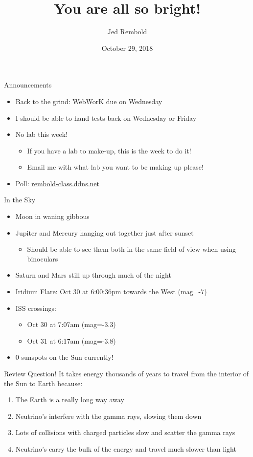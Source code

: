 \documentclass[pdf, aspectratio=169]{beamer}
\title{You are all so bright!}
\date{October 29, 2018}
\author{Jed Rembold}
\begin{document}
\renewcommand*{\theenumi}{\Alph{enumi}}

\begin{frame}{Announcements}
  \begin{itemize}
	  \item Back to the grind: WebWorK due on Wednesday
	  \item I should be able to hand tests back on Wednesday or Friday
	  \item No lab this week!
		  \begin{itemize}
			  \item If you have a lab to make-up, \alert{this is the week to do it}!
			  \item Email me with what lab you want to be making up please!
		  \end{itemize}
	\item Poll: \url{rembold-class.ddns.net}
  \end{itemize}
\end{frame}


\begin{frame}{In the Sky}
	\begin{itemize}
		\item Moon in waning gibbous
		\item Jupiter and Mercury hanging out together just after sunset
			\begin{itemize}
				\item Should be able to see them both in the same field-of-view when using binoculars
			\end{itemize}
		\item Saturn and Mars still up through much of the night
		\item Iridium Flare: Oct 30 at 6:00:36pm towards the West (mag=-7)
		\item ISS crossings:
			\begin{itemize}
				\item Oct 30 at 7:07am (mag=-3.3)
				\item Oct 31 at 6:17am (mag=-3.8)
			\end{itemize}
		\item 0 sunspots on the Sun currently!
	\end{itemize}
\end{frame}

\begin{frame}{Review Question!}
  It takes energy thousands of years to travel from the interior of the Sun to Earth because:
  \begin{enumerate}
	\item The Earth is a really long way away
	\item Neutrino's interfere with the gamma rays, slowing them down
	\item \alert<2>{Lots of collisions with charged particles slow  and scatter the gamma rays}
	\item Neutrino's carry the bulk of the energy and travel much slower than light
  \end{enumerate}

\end{frame}
\end{document}
